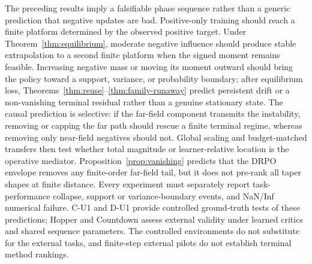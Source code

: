 The preceding results imply a falsifiable phase sequence rather than a generic prediction that negative updates are bad. Positive-only training should reach a finite platform determined by the observed positive target. Under Theorem~\ref{thm:equilibrium}, moderate negative influence should produce stable extrapolation to a second finite platform when the signed moment remains feasible. Increasing negative mass or moving its moment outward should bring the policy toward a support, variance, or probability boundary; after equilibrium loss, Theorems~\ref{thm:reuse}--\ref{thm:family-runaway} predict persistent drift or a non-vanishing terminal residual rather than a genuine stationary state. The causal prediction is selective: if the far-field component transmits the instability, removing or capping the far path should rescue a finite terminal regime, whereas removing only near-field negatives should not. Global scaling and budget-matched transfers then test whether total magnitude or learner-relative location is the operative mediator. Proposition~\ref{prop:vanishing} predicts that the DRPO envelope removes any finite-order far-field tail, but it does not pre-rank all taper shapes at finite distance. Every experiment must separately report task-performance collapse, support or variance-boundary events, and NaN/Inf numerical failure. C-U1 and D-U1 provide controlled ground-truth tests of these predictions; Hopper and Countdown assess external validity under learned critics and shared sequence parameters. The controlled environments do not substitute for the external tasks, and finite-step external pilots do not establish terminal method rankings.
